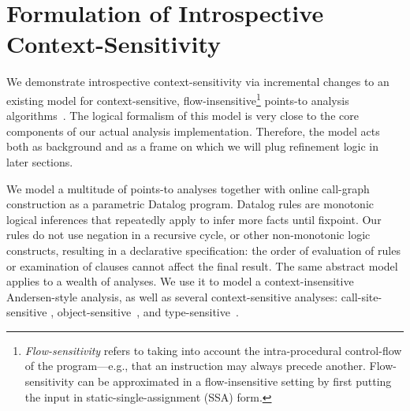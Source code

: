 \section{Formulation of Introspective Context-Sensitivity}
\label{model}

We demonstrate introspective context-sensitivity via incremental
changes to an existing model for context-sensitive,
flow-insensitive\footnote{\emph{Flow-sensitivity} refers to taking
  into account the intra-procedural control-flow of the
  program---e.g., that an instruction may always precede
  another. Flow-sensitivity can be approximated in a flow-insensitive
  setting by first putting the input in static-single-assignment (SSA)
  form.} points-to analysis
algorithms~\cite{cc:2013:Kastrinis,pldi:2013:Kastrinis}. The logical formalism
of this model is very close to the core components of our actual
analysis implementation. Therefore, the model acts both as background
and as a frame on which we will plug refinement logic in later
sections.

We model a multitude of points-to analyses together with online
call-graph construction as a parametric Datalog program.  Datalog
rules are monotonic logical inferences that repeatedly apply to infer
more facts until fixpoint. Our rules do not use negation in a
recursive cycle, or other non-monotonic logic constructs, resulting in
a declarative specification: the order of evaluation of rules or
examination of clauses cannot affect the final result. The same
abstract model applies to a wealth of analyses. We use it to model a
context-insensitive Andersen-style \cite{thesis:Andersen}
analysis, as well as several context-sensitive analyses:
call-site-sensitive \cite{col:1981:Sharir,thesis:Shivers},
object-sensitive~\cite{article:2005:Milanova}, and type-sensitive~\cite{popl:2011:Smaragdakis}.


